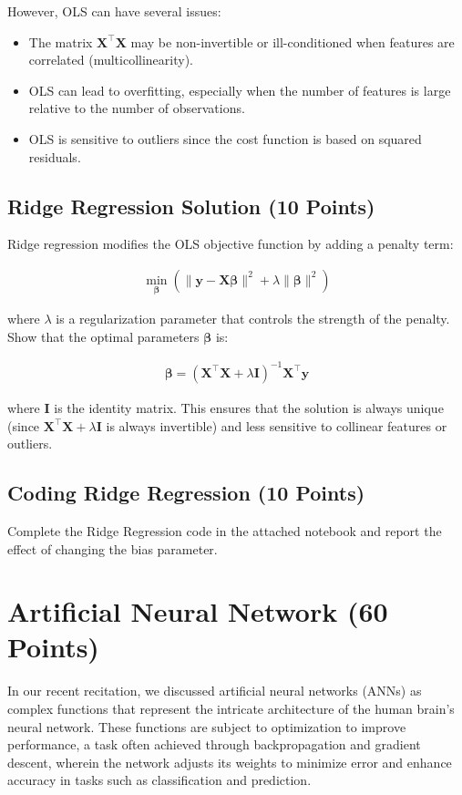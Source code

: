 However, OLS can have several issues:
\begin{itemize}
    \item The matrix $\mathbf{X}^\top \mathbf{X}$ may be non-invertible or ill-conditioned when features are correlated (multicollinearity).
    \item OLS can lead to overfitting, especially when the number of features is large relative to the number of observations.
    \item OLS is sensitive to outliers since the cost function is based on squared residuals.
\end{itemize}

\subsection{Ridge Regression Solution (10 Points)}
Ridge regression modifies the OLS objective function by adding a penalty term:

\begin{align}
\min_{\boldsymbol{\beta}} \left( \|\mathbf{y} - \mathbf{X} \boldsymbol{\beta}\|^2 + \lambda \|\boldsymbol{\beta}\|^2 \right)
\end{align}

where $\lambda$ is a regularization parameter that controls the strength of the penalty. Show that the optimal parameters $\boldsymbol{\beta}$ is:

\begin{align}
\boldsymbol{\beta} = (\mathbf{X}^\top \mathbf{X} + \lambda \mathbf{I})^{-1} \mathbf{X}^\top \mathbf{y}
\end{align}

where $\mathbf{I}$ is the identity matrix. This ensures that the solution is always unique (since $\mathbf{X}^\top \mathbf{X} + \lambda \mathbf{I}$ is always invertible) and less sensitive to collinear features or outliers.

\subsection{Coding Ridge Regression (10 Points)}
Complete the Ridge Regression code in the attached notebook and report the effect of changing the bias parameter.

\section{Artificial Neural Network (60 Points)}
In our recent recitation, we discussed artificial neural networks (ANNs) as complex functions that represent the intricate architecture of the human brain’s neural network. These functions are subject to optimization to improve performance, a task often achieved through backpropagation and gradient descent, wherein the network adjusts its weights to minimize error and enhance accuracy in tasks such as classification and prediction.

